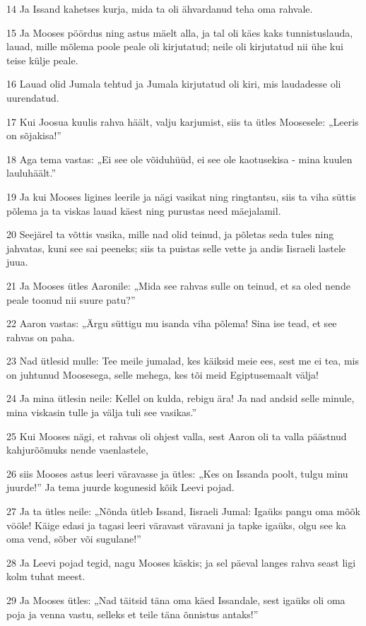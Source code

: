 \par 14 Ja Issand kahetses kurja, mida ta oli ähvardanud teha oma rahvale.
\par 15 Ja Mooses pöördus ning astus mäelt alla, ja tal oli käes kaks tunnistuslauda, lauad, mille mõlema poole peale oli kirjutatud; neile oli kirjutatud nii ühe kui teise külje peale.
\par 16 Lauad olid Jumala tehtud ja Jumala kirjutatud oli kiri, mis laudadesse oli uurendatud.
\par 17 Kui Joosua kuulis rahva häält, valju karjumist, siis ta ütles Moosesele: „Leeris on sõjakisa!”
\par 18 Aga tema vastas: „Ei see ole võiduhüüd, ei see ole kaotusekisa - mina kuulen lauluhäält.”
\par 19 Ja kui Mooses ligines leerile ja nägi vasikat ning ringtantsu, siis ta viha süttis põlema ja ta viskas lauad käest ning purustas need mäejalamil.
\par 20 Seejärel ta võttis vasika, mille nad olid teinud, ja põletas seda tules ning jahvatas, kuni see sai peeneks; siis ta puistas selle vette ja andis Iisraeli lastele juua.
\par 21 Ja Mooses ütles Aaronile: „Mida see rahvas sulle on teinud, et sa oled nende peale toonud nii suure patu?”
\par 22 Aaron vastas: „Ärgu süttigu mu isanda viha põlema! Sina ise tead, et see rahvas on paha.
\par 23 Nad ütlesid mulle: Tee meile jumalad, kes käiksid meie ees, sest me ei tea, mis on juhtunud Moosesega, selle mehega, kes tõi meid Egiptusemaalt välja!
\par 24 Ja mina ütlesin neile: Kellel on kulda, rebigu ära! Ja nad andsid selle minule, mina viskasin tulle ja välja tuli see vasikas.”
\par 25 Kui Mooses nägi, et rahvas oli ohjest valla, sest Aaron oli ta valla päästnud kahjurõõmuks nende vaenlastele,
\par 26 siis Mooses astus leeri väravasse ja ütles: „Kes on Issanda poolt, tulgu minu juurde!” Ja tema juurde kogunesid kõik Leevi pojad.
\par 27 Ja ta ütles neile: „Nõnda ütleb Issand, Iisraeli Jumal: Igaüks pangu oma mõõk vööle! Käige edasi ja tagasi leeri väravast väravani ja tapke igaüks, olgu see ka oma vend, sõber või sugulane!”
\par 28 Ja Leevi pojad tegid, nagu Mooses käskis; ja sel päeval langes rahva seast ligi kolm tuhat meest.
\par 29 Ja Mooses ütles: „Nad täitsid täna oma käed Issandale, sest igaüks oli oma poja ja venna vastu, selleks et teile täna õnnistus antaks!”
